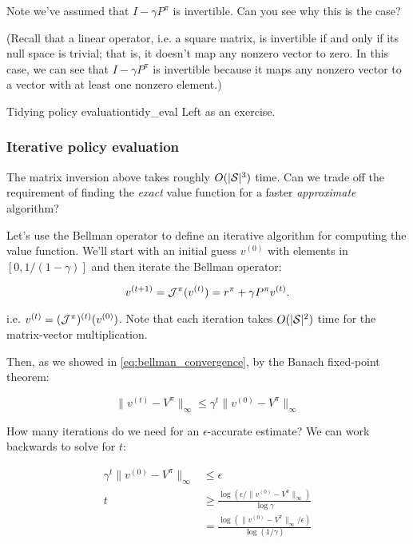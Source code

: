 \documentclass[../main/main]{subfiles}
\begin{document}
Note we've assumed that $I - \gamma P^\pi$ is invertible. Can you see why this is the case?

(Recall that a linear operator, i.e. a square matrix, is invertible if and only if its null space is trivial; that is, it doesn't map any nonzero vector to zero. In this case, we can see that $I - \gamma P^\pi$ is invertible because it maps any nonzero vector to a vector with at least one nonzero element.)

\begin{example}{Tidying policy evaluation}{tidy_eval}
    Left as an exercise.
\end{example}


\subsubsection{Iterative policy evaluation}

The matrix inversion above takes roughly $O(|\S|^3)$ time. Can we trade off the requirement of finding the \emph{exact} value function for a faster \emph{approximate} algorithm?

Let's use the Bellman operator to define an iterative algorithm for computing the value function. We'll start with an initial guess $v^{(0)}$ with elements in $[0, 1/(1-\gamma)]$ and then iterate the Bellman operator:

\[
    v^{(t+1)} = \bop^{\pi}(v^{(t)}) = r^{\pi} + \gamma P^{\pi} v^{(t)}.
\]

i.e. $v^{(t)} = (\bop^{\pi})^{(t)} (v^{(0)})$. Note that each iteration takes $O(|\S|^2)$ time for the matrix-vector multiplication.

Then, as we showed in \ref{eq:bellman_convergence}, by the Banach fixed-point theorem:


\[ \|v^{(t)} - V^\pi \|_{\infty} \le \gamma^{t} \| v^{(0)} - V^\pi\|_{\infty} \]


How many iterations do we need for an $\epsilon$-accurate estimate? We can work backwards to solve for $t$:

\begin{align*}
    \gamma^t \|v^{(0)} - V^\pi\|_{\infty} &\le \epsilon \\
    t &\ge \frac{\log (\epsilon / \|v^{(0)} - V^\pi\|_{\infty})}{\log \gamma} \\
    &= \frac{\log (\|v^{(0)} - V^\pi\|_{\infty} / \epsilon)}{\log (1 / \gamma)} \\
\end{align*}
\end{document}
